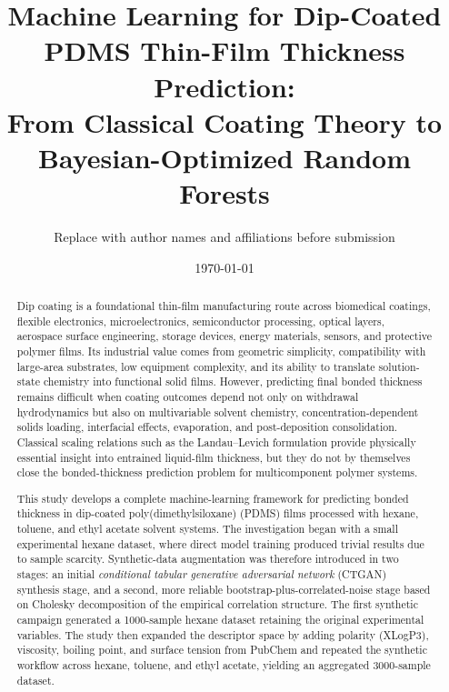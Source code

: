 \documentclass[11pt]{article}
\title{Machine Learning for Dip-Coated PDMS Thin-Film Thickness Prediction:\\
From Classical Coating Theory to Bayesian-Optimized Random Forests}
\author{\small Replace with author names and affiliations before submission}
\date{\today}
\begin{document}
\maketitle

\begin{abstract}
Dip coating is a foundational thin-film manufacturing route across biomedical coatings, flexible electronics, microelectronics, semiconductor processing, optical layers, aerospace surface engineering, storage devices, energy materials, sensors, and protective polymer films. Its industrial value comes from geometric simplicity, compatibility with large-area substrates, low equipment complexity, and its ability to translate solution-state chemistry into functional solid films. However, predicting final bonded thickness remains difficult when coating outcomes depend not only on withdrawal hydrodynamics but also on multivariable solvent chemistry, concentration-dependent solids loading, interfacial effects, evaporation, and post-deposition consolidation. Classical scaling relations such as the Landau--Levich formulation provide physically essential insight into entrained liquid-film thickness, but they do not by themselves close the bonded-thickness prediction problem for multicomponent polymer systems.

This study develops a complete machine-learning framework for predicting bonded thickness in dip-coated poly(dimethylsiloxane) (PDMS) films processed with hexane, toluene, and ethyl acetate solvent systems. The investigation began with a small experimental hexane dataset, where direct model training produced trivial results due to sample scarcity. Synthetic-data augmentation was therefore introduced in two stages: an initial \textit{conditional tabular generative adversarial network} (CTGAN) synthesis stage, and a second, more reliable bootstrap-plus-correlated-noise stage based on Cholesky decomposition of the empirical correlation structure. The first synthetic campaign generated a 1000-sample hexane dataset retaining the original experimental variables. The study then expanded the descriptor space by adding polarity (XLogP3), viscosity, boiling point, and surface tension from PubChem and repeated the synthetic workflow across hexane, toluene, and ethyl acetate, yielding an aggregated 3000-sample dataset.


\end{abstract}
\end{document}
